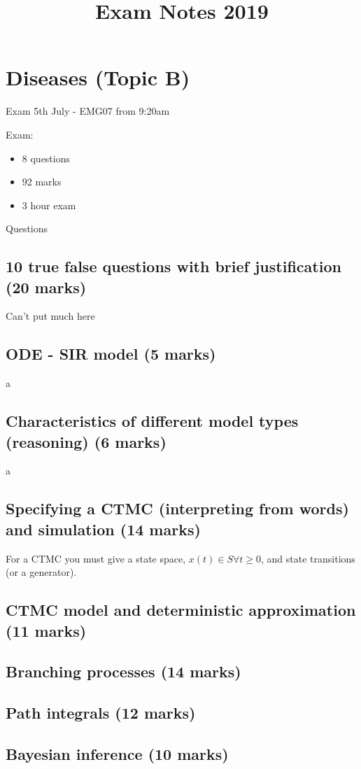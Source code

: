 \documentclass{X:/Documents/Coding/Latex/myassignment}
\title{Exam Notes 2019}
\begin{document}
\section{Diseases (Topic B)}
Exam 5th July - EMG07 from 9:20am

Exam:
\begin{itemize}
    \item 8 questions
    \item 92 marks
    \item 3 hour exam
\end{itemize}
Questions

\subsection{10 true false questions with brief justification (20 marks)}

Can't put much here
\subsection{ODE - SIR model (5 marks)}
a
\subsection{Characteristics of different model types (reasoning) (6 marks)}
a
\subsection{Specifying a CTMC (interpreting from words) and simulation (14 marks)}
For a CTMC you must give a state space, $x(t) \in S \forall t\geq 0$, and state transitions (or a generator). 
\subsection{CTMC model and deterministic approximation (11 marks)}

\subsection{Branching processes (14 marks)}

\subsection{Path integrals (12 marks)}

\subsection{Bayesian inference (10 marks)}
\end{document}
